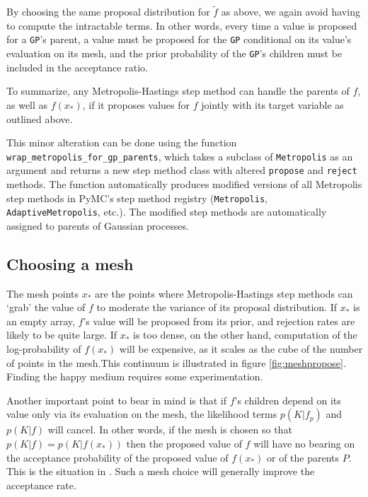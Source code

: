 By choosing the same proposal distribution for $\tilde f$ as above, we again avoid having to compute the intractable terms. In other words, every time a value is proposed for a \texttt{GP}'s parent, a value must be proposed for the \texttt{GP}  conditional on its value's evaluation on its mesh, and the prior probability of the \texttt{GP}'s children must be included in the acceptance ratio.

\bigskip
To summarize, any Metropolis-Hastings step method can handle the parents of $f$, as well as $f(x_*)$, if it proposes values for $f$ jointly with its target variable as outlined above. 

This minor alteration can be done using the function \texttt{wrap_metropolis_for_gp_parents}, which takes a subclass of \texttt{Metropolis} as an argument and returns a new step method class with altered \texttt{propose} and \texttt{reject} methods. The function automatically produces modified versions of all Metropolis step methods in PyMC's step method registry (\texttt{Metropolis}, \texttt{AdaptiveMetropolis}, etc.). The modified step methods are automatically assigned to parents of Gaussian processes.

\subsection{Choosing a mesh} 

The mesh points $x_*$ are the points where Metropolis-Hastings step methods can `grab' the value of $f$ to moderate the variance of its proposal distribution. If $x_*$ is an empty array, $f$'s value will be proposed from its prior, and rejection rates are likely to be quite large. If $x_*$ is too dense, on the other hand, computation of the log-probability of $f(x_*)$ will be expensive, as it scales as the cube of the number of points in the mesh.This continuum is illustrated in figure \ref{fig:meshpropose}. Finding the happy medium requires some experimentation.

Another important point to bear in mind is that if $f$'s children depend on its value only via its evaluation on the mesh, the likelihood terms $p(K|f_p)$ and $p(K|f)$ will cancel. In other words, if the mesh is chosen so that $p(K|f)=p(K|f(x_*))$ then the proposed value of $f$ will have no bearing on the acceptance probability of the proposed value of $f(x_*)$ or of the parents $P$. This is the situation in . Such a mesh choice will generally improve the acceptance rate.

